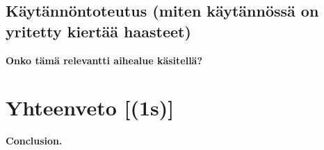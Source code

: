 \documentclass[finnish, grading]{tktltiki2}
\theoremstyle{definition}
\theoremstyle{remark}
\begin{document}
\subsection{Käytännöntoteutus (miten käytännössä on yritetty kiertää haasteet)}

\textbf{Onko tämä relevantti aihealue käsitellä?}







\section{Yhteenveto [(1s)]}

\textbf{Conclusion.}

 






 


\end{document}
